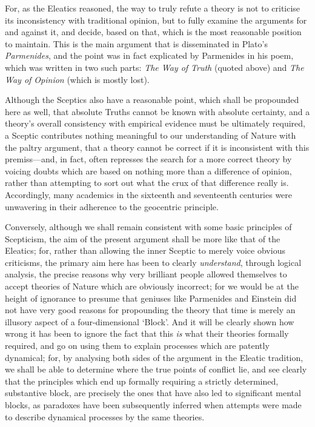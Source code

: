 For, as the Eleatics reasoned, the way to truly refute a theory is not to criticise its inconsistency with traditional opinion, but to fully examine the arguments for and against it, and decide, based on that, which is the most reasonable position to maintain. This is the main argument that is disseminated in Plato's \textit{Parmenides}, and the point was in fact explicated by Parmenides in his poem, which was written in two such parts: \textit{The Way of Truth} (quoted above) and \textit{The Way of Opinion} (which is mostly lost).

Although the Sceptics also have a reasonable point, which shall be propounded here as well, that absolute Truths cannot be known with absolute certainty, and a theory's overall consistency with empirical evidence must be ultimately required, a Sceptic contributes nothing meaningful to our understanding of Nature with the paltry argument, that a theory cannot be correct if it is inconsistent with this premiss---and, in fact, often represses the search for a more correct theory by voicing doubts which are based on nothing more than a difference of opinion, rather than attempting to sort out what the crux of that difference really is. Accordingly, many academics in the sixteenth and seventeenth centuries were unwavering in their adherence to the geocentric principle.

Conversely, although we shall remain consistent with some basic principles of Scepticism, the aim of the present argument shall be more like that of the Eleatics; for, rather than allowing the inner Sceptic to merely voice obvious criticisms, the primary aim here has been to clearly \textit{understand}, through logical analysis, the precise reasons why very brilliant people allowed themselves to accept theories of Nature which are obviously incorrect; for we would be at the height of ignorance to presume that geniuses like Parmenides and Einstein did not have very good reasons for propounding the theory that time is merely an illusory aspect of a four-dimensional `Block'. And it will be clearly shown how wrong it has been to ignore the fact that this \textit{is} what their theories formally required, and go on using them to explain processes which are patently dynamical; for, by analysing both sides of the argument in the Eleatic tradition, we shall be able to determine where the true points of conflict lie, and see clearly that the principles which end up formally requiring a strictly determined, substantive block, are precisely the ones that have also led to significant mental blocks, as paradoxes have been subsequently inferred when attempts were made to describe dynamical processes by the same theories.

